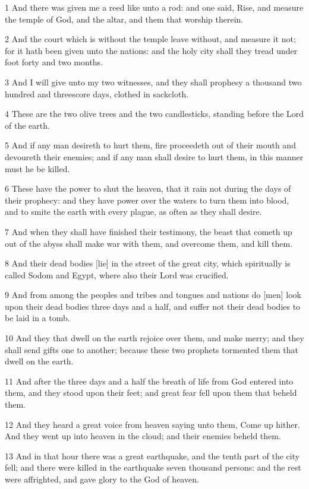 \par 1 And there was given me a reed like unto a rod: and one said, Rise, and measure the temple of God, and the altar, and them that worship therein.
\par 2 And the court which is without the temple leave without, and measure it not; for it hath been given unto the nations: and the holy city shall they tread under foot forty and two months.
\par 3 And I will give unto my two witnesses, and they shall prophesy a thousand two hundred and threescore days, clothed in sackcloth.
\par 4 These are the two olive trees and the two candlesticks, standing before the Lord of the earth.
\par 5 And if any man desireth to hurt them, fire proceedeth out of their mouth and devoureth their enemies; and if any man shall desire to hurt them, in this manner must he be killed.
\par 6 These have the power to shut the heaven, that it rain not during the days of their prophecy: and they have power over the waters to turn them into blood, and to smite the earth with every plague, as often as they shall desire.
\par 7 And when they shall have finished their testimony, the beast that cometh up out of the abyss shall make war with them, and overcome them, and kill them.
\par 8 And their dead bodies [lie] in the street of the great city, which spiritually is called Sodom and Egypt, where also their Lord was crucified.
\par 9 And from among the peoples and tribes and tongues and nations do [men] look upon their dead bodies three days and a half, and suffer not their dead bodies to be laid in a tomb.
\par 10 And they that dwell on the earth rejoice over them, and make merry; and they shall send gifts one to another; because these two prophets tormented them that dwell on the earth.
\par 11 And after the three days and a half the breath of life from God entered into them, and they stood upon their feet; and great fear fell upon them that beheld them.
\par 12 And they heard a great voice from heaven saying unto them, Come up hither. And they went up into heaven in the cloud; and their enemies beheld them.
\par 13 And in that hour there was a great earthquake, and the tenth part of the city fell; and there were killed in the earthquake seven thousand persons: and the rest were affrighted, and gave glory to the God of heaven.
